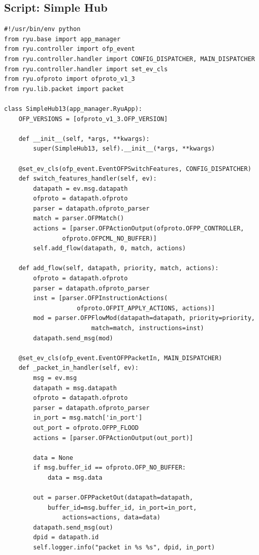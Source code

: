 \documentclass[a4,12pt]{scrartcl}
\begin{document}
\subsection{Script: Simple Hub}
\begin{lstlisting}
#!/usr/bin/env python
from ryu.base import app_manager
from ryu.controller import ofp_event
from ryu.controller.handler import CONFIG_DISPATCHER, MAIN_DISPATCHER
from ryu.controller.handler import set_ev_cls
from ryu.ofproto import ofproto_v1_3
from ryu.lib.packet import packet

class SimpleHub13(app_manager.RyuApp):
    OFP_VERSIONS = [ofproto_v1_3.OFP_VERSION]

    def __init__(self, *args, **kwargs):
        super(SimpleHub13, self).__init__(*args, **kwargs)

    @set_ev_cls(ofp_event.EventOFPSwitchFeatures, CONFIG_DISPATCHER)
    def switch_features_handler(self, ev):
        datapath = ev.msg.datapath
        ofproto = datapath.ofproto
        parser = datapath.ofproto_parser
        match = parser.OFPMatch()
        actions = [parser.OFPActionOutput(ofproto.OFPP_CONTROLLER, 
        		ofproto.OFPCML_NO_BUFFER)]
        self.add_flow(datapath, 0, match, actions)

    def add_flow(self, datapath, priority, match, actions):
        ofproto = datapath.ofproto
        parser = datapath.ofproto_parser
        inst = [parser.OFPInstructionActions(
        			ofproto.OFPIT_APPLY_ACTIONS, actions)]
        mod = parser.OFPFlowMod(datapath=datapath, priority=priority, 
        				match=match, instructions=inst)
        datapath.send_msg(mod)

    @set_ev_cls(ofp_event.EventOFPPacketIn, MAIN_DISPATCHER)
    def _packet_in_handler(self, ev):
        msg = ev.msg
        datapath = msg.datapath
        ofproto = datapath.ofproto
        parser = datapath.ofproto_parser
        in_port = msg.match['in_port']
        out_port = ofproto.OFPP_FLOOD
        actions = [parser.OFPActionOutput(out_port)]

        data = None
        if msg.buffer_id == ofproto.OFP_NO_BUFFER:
            data = msg.data

        out = parser.OFPPacketOut(datapath=datapath, 
        	buffer_id=msg.buffer_id, in_port=in_port, 
        		actions=actions, data=data)
        datapath.send_msg(out)
        dpid = datapath.id
        self.logger.info("packet in %s %s", dpid, in_port)
\end{lstlisting}
\newpage
\end{document}
